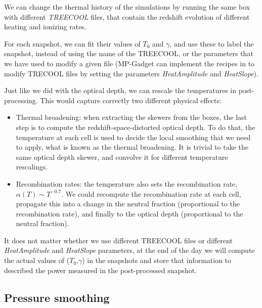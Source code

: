 We can change the thermal history of the simulations by running the same box
with different \textit{TREECOOL} files, that contain the redshift evolution
of different heating and ionizing rates.

For each snapshot, we can fit their values of $T_0$ and $\gamma$, and use 
these to label the snapshot, instead of using the name of the TREECOOL, 
or the parameters that we have used to modify a given file 
(MP-Gadget can implement the recipes in \cite{Bolton2008} to modify TRECOOL
files by setting the parameters \textit{HeatAmplitude} and \textit{HeatSlope}).

Just like we did with the optical depth, we can rescale the temperatures in 
post-processing. 
This would capture correctly two different physical effects:
\begin{itemize}
 \item Thermal broadening: when extracting the skewers from the boxes, 
  the last step is to compute the redshift-space-distorted optical depth. 
  To do that, the temperature at each cell is used to decide the local 
  smoothing that we need to apply, what is known as the thermal broadening. 
  It is trivial to take the same optical depth skewer, and convolve it for
  different temperature rescalings.
 \item Recombination rates: the temperature also sets the recombination rate,
  $\alpha(T) \sim T^{-0.7}$. 
  We could recompute the recombination rate at each cell, 
  propagate this into a change in the neutral fraction (proportional to the 
  recombination rate), and finally to the optical depth (proportional to the 
  neutral fraction).
\end{itemize}

It does not matter whether we use different TREECOOL files or different
\textit{HeatAmplitude} and \textit{HeatSlope} parameters, at the end of the
day we will compute the actual values of ($T_0$,$\gamma$) in the snapshots
and store that information to described the power measured in the
post-processed snapshot.


\subsection{Pressure smoothing}


